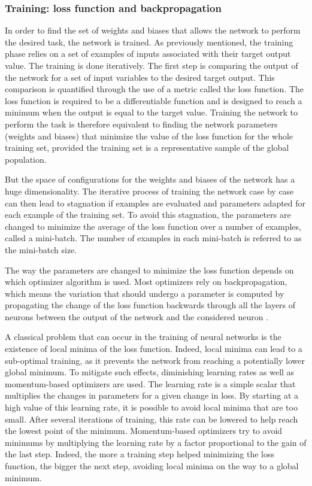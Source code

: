 \subsubsection{Training: loss function and backpropagation}

In order to find the set of weights and biases that allows the network to perform the desired task, the network is trained.
As previously mentioned, the training phase relies on a set of examples of inputs associated with their target output value. The training is done iteratively. The first step is comparing the output of the network for a set of input variables to the desired target output. This comparison is quantified through the use of a metric called the loss function. The loss function is required to be a differentiable function and is designed to reach a minimum when the output is equal to the target value. Training the network to perform the task is therefore equivalent to finding the network parameters (weights and biases) that minimize the value of the loss function for the whole training set, provided the training set is a representative sample of the global population.

But the space of configurations for the weights and biases of the network has a huge dimensionality. The iterative process of training the network case by case can then lead to stagnation if examples are evaluated and parameters adapted for each example of the training set. To avoid this stagnation, the parameters are changed to minimize the average of the loss function over a number of examples, called a mini-batch. The number of examples in each mini-batch is referred to as the mini-batch size.

The way the parameters are changed to minimize the loss function depends on which optimizer algorithm is used. Most optimizers rely on backpropagation, which means the variation that should undergo a parameter is computed by propagating the change of the loss function backwards through all the layers of neurons between the output of the network and the considered neuron \cite{1986Natur.323..533R}.


A classical problem that can occur in the training of neural networks is the existence of local minima of the loss function. Indeed, local minima can lead to a sub-optimal training, as it prevents the network from reaching a potentially lower global minimum. To mitigate such effects, diminishing learning rates as well as momentum-based optimizers are used. The learning rate is a simple scalar that multiplies the changes in parameters for a given change in loss. By starting at a high value of this learning rate, it is possible to avoid local minima that are too small. After several iterations of training, this rate can be lowered to help reach the lowest point of the minimum. Momentum-based optimizers try to avoid minimums by multiplying the learning rate by a factor proportional to the gain of the last step. Indeed, the more a training step helped minimizing the loss function, the bigger the next step, avoiding local minima on the way to a global minimum.

